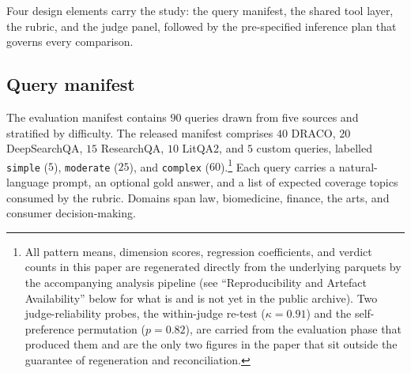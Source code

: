 \documentclass[11pt]{article}
\begin{document}
Four design elements carry the study: the query manifest, the shared tool layer, the
rubric, and the judge panel, followed by the pre-specified inference plan that governs
every comparison.

\subsection{Query manifest}
The evaluation manifest contains $90$ queries drawn from five sources and stratified
by difficulty. The released manifest comprises
$40$ DRACO, $20$ DeepSearchQA, $15$ ResearchQA, $10$ LitQA2, and $5$ custom queries,
labelled \texttt{simple} ($5$), \texttt{moderate} ($25$), and \texttt{complex}
($60$).\footnote{All pattern means, dimension scores, regression coefficients, and verdict
counts in this paper are regenerated directly from the underlying parquets by the
accompanying analysis pipeline (see ``Reproducibility and Artefact Availability'' below for what
is and is not yet in the public archive). Two judge-reliability probes, the within-judge
re-test ($\kappa{=}0.91$) and the self-preference permutation ($p{=}0.82$), are carried from
the evaluation phase that produced them and are the only two figures in the paper that sit
outside the guarantee of regeneration and reconciliation.}
Each query carries a natural-language prompt, an optional gold answer, and a list of
expected coverage topics consumed by the rubric. Domains span law, biomedicine,
finance, the arts, and consumer decision-making.
\end{document}
